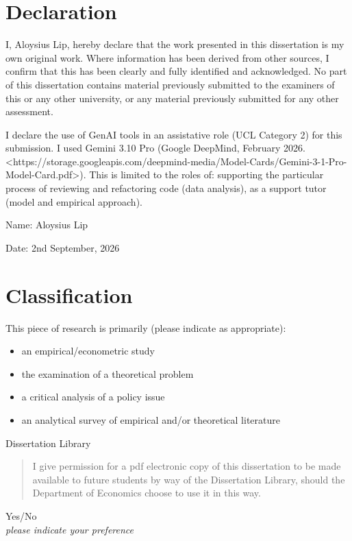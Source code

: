 \section*{Declaration}

I, Aloysius Lip, hereby declare that the work presented in this
dissertation is my own original work. Where information has been derived from
other sources, I confirm that this has been clearly and fully identified and
acknowledged. No part of this dissertation contains material previously
submitted to the examiners of this or any other university, or any material
previously submitted for any other assessment.

I declare the use of GenAI tools in an assistative role (UCL Category 2) for this submission.
I used Gemini 3.10 Pro (Google DeepMind, February 2026. <https://storage.googleapis.com/deepmind-media/Model-Cards/Gemini-3-1-Pro-Model-Card.pdf>).
This is limited to the roles of: supporting the particular process of reviewing and refactoring code (data analysis),
as a support tutor (model and empirical approach).

\medskip
Name: Aloysius Lip

\medskip
Date: 2nd September, 2026

\vspace{2cm}

\section*{Classification}

This piece of research is primarily (please indicate as appropriate):

\begin{itemize}[label=$\square$, leftmargin=2em, itemsep=2pt, topsep=0.5em]
    \item[$\checkmark$] an empirical/econometric study
    \item the examination of a theoretical problem
    \item a critical analysis of a policy issue
    \item an analytical survey of empirical and/or theoretical literature
\end{itemize}

\vspace{2cm}

\begin{center}
    Dissertation Library
\end{center}

\begin{quote}
I give permission for a pdf electronic copy of this dissertation to be made
available to future students by way of the Dissertation Library, should the
Department of Economics choose to use it in this way.
\end{quote}

\begin{center}
    Yes/No\\[0.5em]
    \textit{please indicate your preference}
\end{center}
